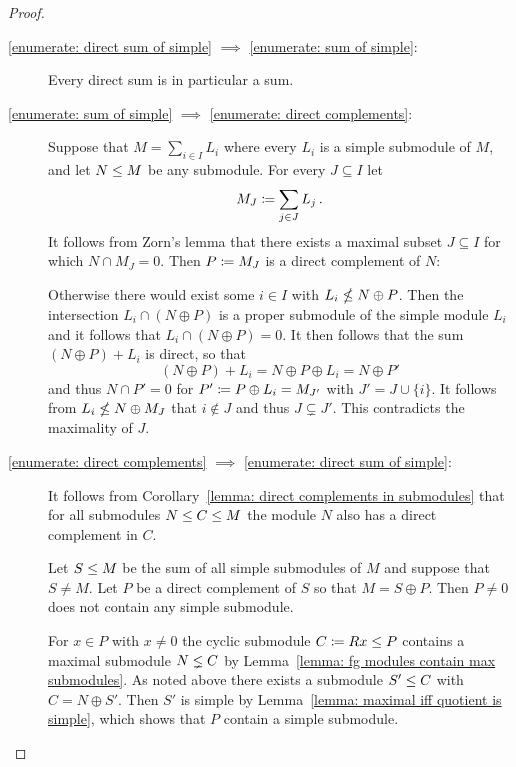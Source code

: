 \begin{proof}
  \leavevmode
  \begin{description}
    \item[\ref*{enumerate: direct sum of simple} $\implies$ \ref*{enumerate: sum of simple}:]
      Every direct sum is in particular a sum.
    \item[\ref*{enumerate: sum of simple} $\implies$ \ref*{enumerate: direct complements}:]
      Suppose that $M = \sum_{i \in I} L_i$ where every $L_i$ is a simple submodule of $M$, and let $N \leq M$ be any submodule.
      For every $J \subseteq I$ let
      \[
                  M_J
        \coloneqq  \sum_{j \in J} L_j \,.
      \]
      It follows from Zorn’s lemma that there exists a maximal subset $J \subseteq I$ for which $N \cap M_J = 0$.
      Then $P \coloneqq M_J$ is a direct complement of $N$:
      
      Otherwise there would exist some $i \in I$ with $L_i \nleq N \oplus P$.
      Then the intersection $L_i \cap (N \oplus P)$ is a proper submodule of the simple module $L_i$ and it follows that $L_i \cap (N \oplus P) = 0$.
      It then follows that the sum $(N \oplus P) + L_i$ is direct, so that
      \[
          (N \oplus P) + L_i
        = N \oplus P \oplus L_i
        = N \oplus P'
      \]
      and thus $N \cap P' = 0$ for $P' \coloneqq P \oplus L_i = M_{J'}$ with $J' = J \cup \{i\}$.
      It follows from $L_i \nleq N \oplus M_J$ that $i \notin J$ and thus $J \subsetneq J'$.
      This contradicts the maximality of $J$.
    \item[\ref*{enumerate: direct complements} $\implies$ \ref*{enumerate: direct sum of simple}:]
      It follows from Corollary~\ref{lemma: direct complements in submodules} that for all submodules $N \leq C \leq M$ the module $N$ also has a direct complement in $C$.
      
      Let $S \leq M$ be the sum of all simple submodules of $M$ and suppose that $S \neq M$.
      Let $P$ be a direct complement of $S$ so that $M = S \oplus P$.
      Then $P \neq 0$ does not contain any simple submodule.
      
      For $x \in P$ with $x \neq 0$ the cyclic submodule $C \coloneqq Rx \leq P$ contains a maximal submodule $N \lneq C$ by Lemma~\ref{lemma: fg modules contain max submodules}.
      As noted above there exists a submodule $S' \leq C$ with $C = N \oplus S'$.
      Then $S'$ is simple by Lemma~\ref{lemma: maximal iff quotient is simple}, which shows that $P$ contain a simple submodule.
    \qedhere
  \end{description}
\end{proof}



